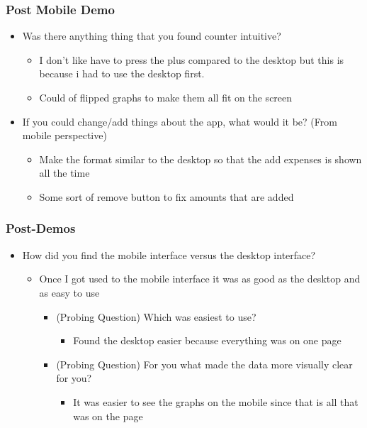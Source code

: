 \documentclass{chi2011}
\begin{document}
\begin{itemize}[noitemsep]
	\subsubsection{Post Mobile Demo}
	\begin{itemize}[noitemsep]
		\item Was there anything thing that you found counter intuitive?
			\begin{itemize}[noitemsep]
				\item I don't like have to press the plus compared to the desktop but this is
				  because i had to use the desktop first. 
			  	\item Could of flipped graphs to make them all fit on the screen
			\end{itemize}
		\item If you could change/add things about the app, what would it be? (From mobile perspective)
		\begin{itemize}[noitemsep]
			\item Make the format similar to the desktop so that the add
				expenses is shown all the time
			\item Some sort of remove button to fix amounts that are added
		\end{itemize}
	\end{itemize}

	\subsubsection{Post-Demos}
	\begin{itemize}[noitemsep]
		\item How did you find the mobile interface versus the desktop interface?
		\begin{itemize}[noitemsep]
				\item Once I got used to the mobile interface it was as good as
					the desktop and as easy to use
			\begin{itemize}[noitemsep]
				\item (Probing Question) Which was easiest to use?
				\begin{itemize}[noitemsep]
					\item Found the desktop easier because everything was on one
						page
				\end{itemize}
			\item (Probing Question) For you what made the data more visually clear for you?
				\begin{itemize}[noitemsep]
					\item It was easier to see the graphs on the mobile since
						that is all that was on the page
				\end{itemize}
			\end{itemize}
		\end{itemize}


\end{itemize}
\end{itemize}
\end{document}
